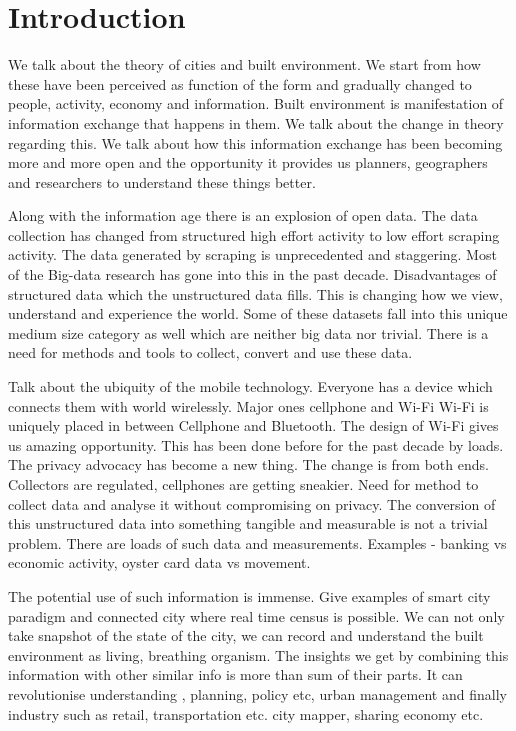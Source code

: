 \chapter{Introduction}


We talk about the theory of cities and built environment. We start from how
these have been perceived as function of the form and gradually changed to
people, activity, economy and information. Built environment is manifestation of
information exchange that happens in them. We talk about the change in theory
regarding this. We talk about how this information exchange has been becoming
more and more open and the opportunity it provides us planners, geographers and
researchers to understand these things better.

Along with the information age there is an explosion of open data. The data
collection has changed from structured high effort activity to low effort
scraping activity. The data generated by scraping is unprecedented and
staggering. Most of the Big-data research has gone into this in the past decade.
Disadvantages of structured data which the unstructured data fills. This is
changing how we view, understand and experience the world. Some of these
datasets fall into this unique medium size category as well which are neither
big data nor trivial. There is a need for methods and tools to collect, convert
and use these data.

Talk about the ubiquity of the mobile technology. Everyone has a device which
connects them with world wirelessly. Major ones cellphone and Wi-Fi Wi-Fi is
uniquely placed in between Cellphone and Bluetooth. The design of Wi-Fi gives us
amazing opportunity. This has been done before for the past decade by loads. The
privacy advocacy has become a new thing. The change is from both ends.
Collectors are regulated, cellphones are getting sneakier. Need for method to
collect data and analyse it without compromising on privacy. The conversion of
this unstructured data into something tangible and measurable is not a trivial
problem. There are loads of such data and measurements. Examples - banking vs
economic activity, oyster card data vs movement.

The potential use of such information is immense. Give examples of smart city
paradigm and connected city where real time census is possible. We can not only
take snapshot of the state of the city, we can record and understand the built
environment as living, breathing organism. The insights we get by combining this
information with other similar info is more than sum of their parts. It can
revolutionise understanding , planning, policy etc, urban management and finally
industry such as retail, transportation etc. city mapper, sharing economy etc.
